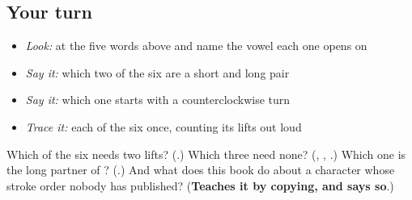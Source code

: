 \subsection*{Your turn}
\begin{itemize}
\raggedright
  \item \emph{Look:} at the five words above and name the vowel each one opens on
  \item \emph{Say it:} which two of the six are a short and long pair
  \item \emph{Say it:} which one starts with a counterclockwise turn
  \item \emph{Trace it:} each of the six once, counting its lifts out loud
\end{itemize}

\begin{tcolorbox}[breakable,colback=teal!4,colframe=teal!35!black,title={Before you move on}]
Which of the six needs two lifts? (\textbf{}.) Which three need none? (\textbf{}, \textbf{}, \textbf{}.) Which one is the long partner of ? (\textbf{}.) And what does this book do about a character whose stroke order nobody has published? (\textbf{Teaches it by copying, and says so}.)
\end{tcolorbox}
